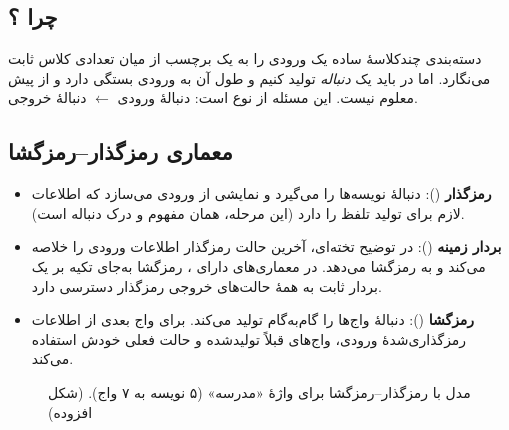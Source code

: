 \subsection{چرا ؟}
دسته‌بندی چندکلاسهٔ ساده یک ورودی را به یک برچسب از میان تعدادی کلاس ثابت می‌نگارد. اما در  باید یک \emph{دنباله} تولید کنیم و طول آن به ورودی بستگی دارد و از پیش معلوم نیست. این مسئله از نوع  است: دنبالهٔ ورودی $\leftarrow$ دنبالهٔ خروجی.

\subsection{معماری رمزگذار–رمزگشا}
\begin{itemize}
  \item \textbf{رمزگذار} (): دنبالهٔ نویسه‌ها را می‌گیرد و نمایشی از ورودی می‌سازد که اطلاعات لازم برای تولید تلفظ را دارد (این مرحله، همان مفهوم  و درک دنباله است).
  \item \textbf{بردار زمینه} (): در توضیح تخته‌ای، آخرین حالت رمزگذار اطلاعات ورودی را خلاصه می‌کند و به رمزگشا می‌دهد. در معماری‌های دارای ، رمزگشا به‌جای تکیه بر یک بردار ثابت به همهٔ حالت‌های خروجی رمزگذار دسترسی دارد.
  \item \textbf{رمزگشا} (): دنبالهٔ واج‌ها را گام‌به‌گام تولید می‌کند. برای واج بعدی از اطلاعات رمزگذاری‌شدهٔ ورودی، واج‌های قبلاً تولیدشده و حالت فعلی خودش استفاده می‌کند.
\end{itemize}

\begin{figure}[htbp]
\centering
{}
\caption{مدل  با رمزگذار–رمزگشا برای واژهٔ «مدرسه» (۵ نویسه به ۷ واج). (شکل افزوده)}
\end{figure}

